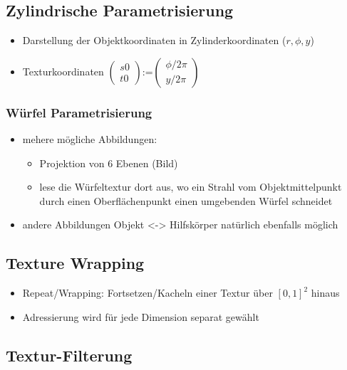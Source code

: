 \documentclass[paper=a4, fontsize=11pt]{scrartcl} %
\numberwithin{equation}{section} %
\numberwithin{figure}{section} %
\numberwithin{table}{section} %
\begin{document}
\subsection{Zylindrische Parametrisierung}

\begin{itemize}
\item Darstellung der Objektkoordinaten in Zylinderkoordinaten ($r,\phi,y$)
\item Texturkoordinaten $\left(
   \begin{array}{c}
     s 0\\
     t 0
   	\end{array}
	\right)
 $:=$ \left(
 	\begin{array}{c}
     \phi /2\pi\\
     y/2\pi
   \end{array}
	\right)$
\end{itemize}

\subsubsection{Würfel Parametrisierung}

\begin{itemize}
\item mehere mögliche Abbildungen:
\begin{itemize}
\item Projektion von 6 Ebenen (Bild)
\item lese die Würfeltextur dort aus, wo ein Strahl vom Objektmittelpunkt durch einen Oberflächenpunkt einen umgebenden Würfel schneidet
\end{itemize}
\item andere Abbildungen Objekt <-> Hilfskörper natürlich ebenfalls möglich
\end{itemize}

\subsection{Texture Wrapping}

\begin{itemize}
\item Repeat/Wrapping: Fortsetzen/Kacheln einer Textur über $[0,1]^2$ hinaus
\item Adressierung wird für jede Dimension separat gewählt
\end{itemize}

\subsection{Textur-Filterung}
\end{document}
